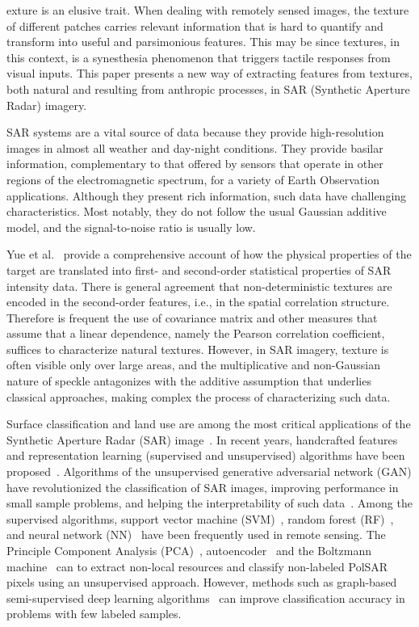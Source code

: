 \documentclass[journal]{IEEEtran}
\begin{document}
exture is an elusive trait.
When dealing with remotely sensed images, the texture of different patches carries relevant information that is hard to quantify and transform into useful and parsimonious features.
This may be since textures, in this context, is a synesthesia phenomenon that triggers tactile responses from visual inputs.
This paper presents a new way of extracting features from textures, both natural and resulting from anthropic processes, in SAR (Synthetic Aperture Radar) imagery.

SAR systems are a vital source of data because they provide high-resolution images in almost all weather and day-night conditions.
They provide basilar information, complementary to that offered by sensors that operate in other regions of the electromagnetic spectrum, for a variety of Earth Observation applications.	
Although they present rich information, such data have challenging characteristics.
Most notably, they do not follow the usual Gaussian additive model, and the signal-to-noise ratio is usually low.

Yue et al.~\cite{Yue2020Gaussian} provide a comprehensive account of how the physical properties of the target are translated into first- and second-order statistical properties of SAR intensity data.
There is general agreement that non-deterministic textures are encoded in the second-order features, i.e., in the spatial correlation structure.
Therefore is frequent the use of covariance matrix and other measures that assume that a linear dependence, namely the Pearson correlation coefficient, suffices to characterize natural textures.
However, in SAR imagery, texture is often visible only over large areas, and the multiplicative and non-Gaussian nature of speckle antagonizes with the additive assumption that underlies classical approaches, making complex the process of characterizing such data.

Surface classification and land use are among the most critical applications of the Synthetic Aperture Radar (SAR) image~\cite{Pottier2004Unsupervised}.
In recent years, handcrafted features and representation learning (supervised and unsupervised) algorithms have been proposed~\cite{han2020unsupervised, huang2020classification, xie2020polsar}.
Algorithms of the unsupervised generative adversarial network (GAN) have revolutionized the classification of SAR images, improving performance in small sample problems, and helping the interpretability of such data~\cite{liu2019task}.
Among the supervised algorithms, support vector machine (SVM)~\cite{sukawattanavijit2017ga}, random forest (RF)~\cite{mcnairn2014early}, and neural network (NN)~\cite{lin2017deep} have been frequently used in remote sensing.
The Principle Component Analysis (PCA)~\cite{ressel2015neural}, autoencoder~\cite{wang2019classification} and the Boltzmann machine~\cite{qin2017object} can to extract non-local resources and classify non-labeled PolSAR pixels using an unsupervised approach.
However, methods such as graph-based semi-supervised deep learning algorithms~\cite{bi2018graph} can improve classification accuracy in problems with few labeled samples.
\end{document}
